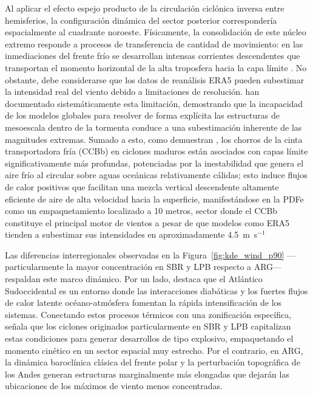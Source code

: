 Al aplicar el efecto espejo producto de la circulación ciclónica inversa entre hemisferios, la configuración dinámica del sector posterior correspondería espacialmente al cuadrante noroeste. 
Físicamente, la consolidación de este núcleo extremo responde a procesos de transferencia de cantidad de movimiento: en las inmediaciones del frente frío se desarrollan intensas corrientes descendentes que transportan el momento horizontal de la alta troposfera hacia la capa límite \citep{hyeok2024extrem}. 
No obstante, debe considerarse que los datos de reanálisis ERA5 pueden subestimar la intensidad real del viento debido a limitaciones de resolución. 
\citet{priestley2022improved} han documentado sistemáticamente esta limitación, demostrando que la incapacidad de los modelos globales para resolver de forma explícita las estructuras de mesoescala dentro de la tormenta conduce a una subestimación inherente de las magnitudes extremas. 
Sumado a esto, como demuestran \citet{gentile2023observed}, los chorros de la cinta transportadora fría (CCBb) en ciclones maduros están asociados con capas límite significativamente más profundas, potenciadas por la inestabilidad que genera el aire frío al circular sobre aguas oceánicas relativamente cálidas; esto induce flujos de calor positivos que facilitan una mezcla vertical descendente altamente eficiente de aire de alta velocidad hacia la superficie, manifestándose en la PDFe como un empaquetamiento localizado a 10 metros, sector donde el CCBb constituye el principal motor de vientos a pesar de que modelos como ERA5 tienden a subestimar sus intensidades en aproximadamente 4.5~m~s$^{-1}$

Las diferencias interregionales observadas en la Figura~\ref{fig:kde_wind_p90} —particularmente la mayor concentración en SBR y LPB respecto a ARG— respaldan este marco dinámico. Por un lado, \citet{reboita2018extratropical} destaca que el Atlántico Sudoccidental es un entorno donde las interacciones diabáticas y los fuertes flujos de calor latente océano-atmósfera fomentan la rápida intensificación de los sistemas. Conectando estos procesos térmicos con una zonificación específica, \citet{gramcianinov2023impact} señala que los ciclones originados particularmente en SBR y LPB capitalizan estas condiciones para generar desarrollos de tipo explosivo, empaquetando el momento cinético en un sector espacial muy estrecho. Por el contrario, en ARG, la dinámica baroclínica clásica del frente polar y la perturbación topográfica de los Andes generan estructuras marginalmente más elongadas que dejarán las ubicaciones de los máximos de viento menos concentradas.


